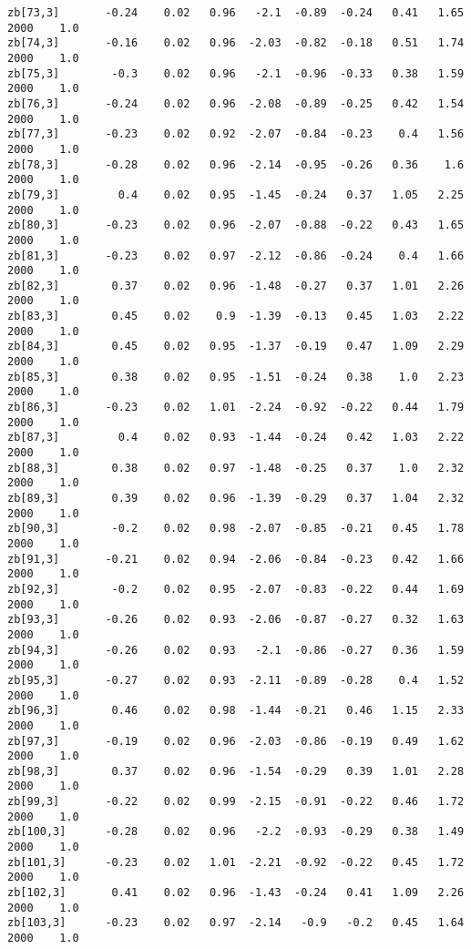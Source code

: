 \documentclass[11pt]{article}
\begin{document}
\begin{Verbatim}[commandchars=\\\{\}]
zb[73,3]       -0.24    0.02   0.96   -2.1  -0.89  -0.24   0.41   1.65   2000    1.0
zb[74,3]       -0.16    0.02   0.96  -2.03  -0.82  -0.18   0.51   1.74   2000    1.0
zb[75,3]        -0.3    0.02   0.96   -2.1  -0.96  -0.33   0.38   1.59   2000    1.0
zb[76,3]       -0.24    0.02   0.96  -2.08  -0.89  -0.25   0.42   1.54   2000    1.0
zb[77,3]       -0.23    0.02   0.92  -2.07  -0.84  -0.23    0.4   1.56   2000    1.0
zb[78,3]       -0.28    0.02   0.96  -2.14  -0.95  -0.26   0.36    1.6   2000    1.0
zb[79,3]         0.4    0.02   0.95  -1.45  -0.24   0.37   1.05   2.25   2000    1.0
zb[80,3]       -0.23    0.02   0.96  -2.07  -0.88  -0.22   0.43   1.65   2000    1.0
zb[81,3]       -0.23    0.02   0.97  -2.12  -0.86  -0.24    0.4   1.66   2000    1.0
zb[82,3]        0.37    0.02   0.96  -1.48  -0.27   0.37   1.01   2.26   2000    1.0
zb[83,3]        0.45    0.02    0.9  -1.39  -0.13   0.45   1.03   2.22   2000    1.0
zb[84,3]        0.45    0.02   0.95  -1.37  -0.19   0.47   1.09   2.29   2000    1.0
zb[85,3]        0.38    0.02   0.95  -1.51  -0.24   0.38    1.0   2.23   2000    1.0
zb[86,3]       -0.23    0.02   1.01  -2.24  -0.92  -0.22   0.44   1.79   2000    1.0
zb[87,3]         0.4    0.02   0.93  -1.44  -0.24   0.42   1.03   2.22   2000    1.0
zb[88,3]        0.38    0.02   0.97  -1.48  -0.25   0.37    1.0   2.32   2000    1.0
zb[89,3]        0.39    0.02   0.96  -1.39  -0.29   0.37   1.04   2.32   2000    1.0
zb[90,3]        -0.2    0.02   0.98  -2.07  -0.85  -0.21   0.45   1.78   2000    1.0
zb[91,3]       -0.21    0.02   0.94  -2.06  -0.84  -0.23   0.42   1.66   2000    1.0
zb[92,3]        -0.2    0.02   0.95  -2.07  -0.83  -0.22   0.44   1.69   2000    1.0
zb[93,3]       -0.26    0.02   0.93  -2.06  -0.87  -0.27   0.32   1.63   2000    1.0
zb[94,3]       -0.26    0.02   0.93   -2.1  -0.86  -0.27   0.36   1.59   2000    1.0
zb[95,3]       -0.27    0.02   0.93  -2.11  -0.89  -0.28    0.4   1.52   2000    1.0
zb[96,3]        0.46    0.02   0.98  -1.44  -0.21   0.46   1.15   2.33   2000    1.0
zb[97,3]       -0.19    0.02   0.96  -2.03  -0.86  -0.19   0.49   1.62   2000    1.0
zb[98,3]        0.37    0.02   0.96  -1.54  -0.29   0.39   1.01   2.28   2000    1.0
zb[99,3]       -0.22    0.02   0.99  -2.15  -0.91  -0.22   0.46   1.72   2000    1.0
zb[100,3]      -0.28    0.02   0.96   -2.2  -0.93  -0.29   0.38   1.49   2000    1.0
zb[101,3]      -0.23    0.02   1.01  -2.21  -0.92  -0.22   0.45   1.72   2000    1.0
zb[102,3]       0.41    0.02   0.96  -1.43  -0.24   0.41   1.09   2.26   2000    1.0
zb[103,3]      -0.23    0.02   0.97  -2.14   -0.9   -0.2   0.45   1.64   2000    1.0

\end{Verbatim}
\end{document}

